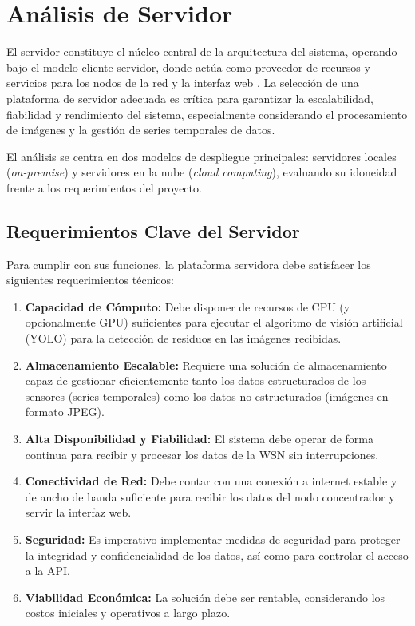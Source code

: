 
\section{Análisis de Servidor}

El servidor constituye el núcleo central de la arquitectura del sistema, operando bajo el modelo cliente-servidor, donde actúa como proveedor de recursos y servicios para los nodos de la red y la interfaz web \cite{supermicro2024}. La selección de una plataforma de servidor adecuada es crítica para garantizar la escalabilidad, fiabilidad y rendimiento del sistema, especialmente considerando el procesamiento de imágenes y la gestión de series temporales de datos.

El análisis se centra en dos modelos de despliegue principales: servidores locales (\textit{on-premise}) y servidores en la nube (\textit{cloud computing}), evaluando su idoneidad frente a los requerimientos del proyecto.

\subsection{Requerimientos Clave del Servidor}
\label{subsec:reqs_servidor}

Para cumplir con sus funciones, la plataforma servidora debe satisfacer los siguientes requerimientos técnicos:

\begin{enumerate}
    \item \textbf{Capacidad de Cómputo:} Debe disponer de recursos de CPU (y opcionalmente GPU) suficientes para ejecutar el algoritmo de visión artificial (YOLO) para la detección de residuos en las imágenes recibidas.
    \item \textbf{Almacenamiento Escalable:} Requiere una solución de almacenamiento capaz de gestionar eficientemente tanto los datos estructurados de los sensores (series temporales) como los datos no estructurados (imágenes en formato JPEG).
    \item \textbf{Alta Disponibilidad y Fiabilidad:} El sistema debe operar de forma continua para recibir y procesar los datos de la WSN sin interrupciones.
    \item \textbf{Conectividad de Red:} Debe contar con una conexión a internet estable y de ancho de banda suficiente para recibir los datos del nodo concentrador y servir la interfaz web.
    \item \textbf{Seguridad:} Es imperativo implementar medidas de seguridad para proteger la integridad y confidencialidad de los datos, así como para controlar el acceso a la API.
    \item \textbf{Viabilidad Económica:} La solución debe ser rentable, considerando los costos iniciales y operativos a largo plazo.
\end{enumerate}


